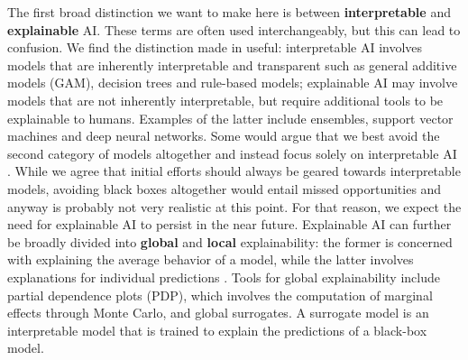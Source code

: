 \documentclass{juliacon}
\begin{document}
The first broad distinction we want to make here is between
\textbf{interpretable} and \textbf{explainable} AI. These terms are
often used interchangeably, but this can lead to confusion. We find the
distinction made in \cite{rudin2019stop} useful: interpretable AI
involves models that are inherently interpretable and transparent such
as general additive models (GAM), decision trees and rule-based models;
explainable AI may involve models that are not inherently interpretable,
but require additional tools to be explainable to humans. Examples of
the latter include ensembles, support vector machines and deep neural
networks. Some would argue that we best avoid the second category of
models altogether and instead focus solely on interpretable AI
\cite{rudin2019stop}. While we agree that initial efforts should always
be geared towards interpretable models, avoiding black boxes altogether
would entail missed opportunities and anyway is probably not very
realistic at this point. For that reason, we expect the need for
explainable AI to persist in the near future. Explainable AI can further
be broadly divided into \textbf{global} and \textbf{local}
explainability: the former is concerned with explaining the average
behavior of a model, while the latter involves explanations for
individual predictions \cite{molnar2020interpretable}. Tools for global
explainability include partial dependence plots (PDP), which involves
the computation of marginal effects through Monte Carlo, and global
surrogates. A surrogate model is an interpretable model that is trained
to explain the predictions of a black-box model.
\end{document}
